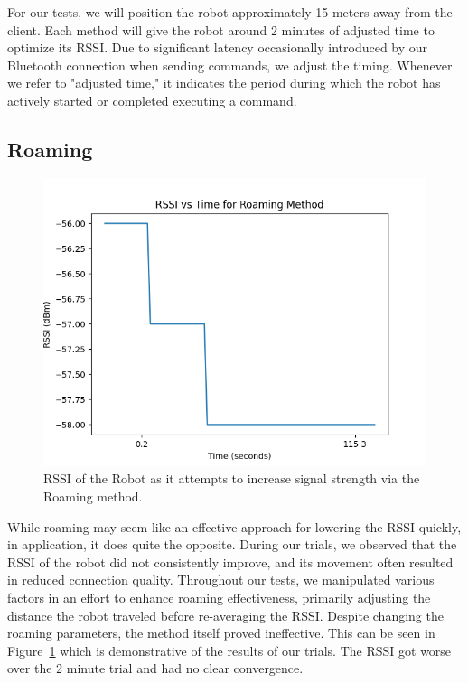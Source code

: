 For our tests, we will position the robot approximately 15 meters away from the client. Each method will give the robot around 2 minutes of adjusted time to optimize its RSSI. Due to significant latency occasionally introduced by our Bluetooth connection when sending commands, we adjust the timing. Whenever we refer to "adjusted time," it indicates the period during which the robot has actively started or completed executing a command.

\subsection{Roaming}

\begin{figure}[tp]

\centering

\includegraphics[scale=0.5]{figures/rssi_roaming}

\caption{RSSI of the Robot as it attempts to increase signal strength via the Roaming method. }

\label{fig:rssi_roaming}

\end{figure}

While roaming may seem like an effective approach for lowering the RSSI quickly, in application, it does quite the opposite. During our trials, we observed that the RSSI of the robot did not consistently improve, and its movement often resulted in reduced connection quality. Throughout our tests, we manipulated various factors in an effort to enhance roaming effectiveness, primarily adjusting the distance the robot traveled before re-averaging the RSSI. Despite changing the roaming parameters, the method itself proved ineffective. This can be seen in Figure~\ref{fig:rssi_roaming} which is demonstrative of the results of our trials. The RSSI got worse over the 2 minute trial and had no clear convergence.

